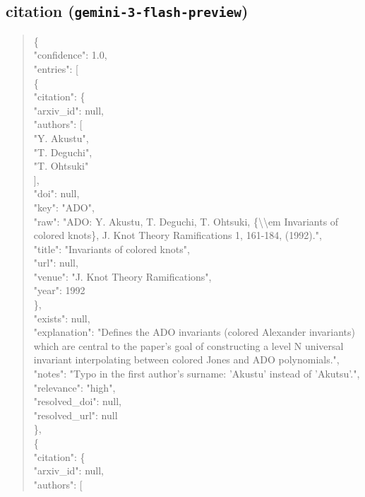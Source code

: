 \documentclass[11pt]{article}
\begin{document}
\subsection*{citation (\texttt{gemini-3-flash-preview})}
\begin{quote}\small\ttfamily\raggedright
\{\\
  "confidence": 1.0,\\
  "entries": [\\
    \{\\
      "citation": \{\\
        "arxiv\_id": null,\\
        "authors": [\\
          "Y. Akustu",\\
          "T. Deguchi",\\
          "T. Ohtsuki"\\
        ],\\
        "doi": null,\\
        "key": "ADO",\\
        "raw": "ADO: Y. Akustu, T. Deguchi, T. Ohtsuki, \{\textbackslash{}\textbackslash{}em Invariants of colored knots\}, J. Knot Theory Ramifications 1, 161-184, (1992).",\\
        "title": "Invariants of colored knots",\\
        "url": null,\\
        "venue": "J. Knot Theory Ramifications",\\
        "year": 1992\\
      \},\\
      "exists": null,\\
      "explanation": "Defines the ADO invariants (colored Alexander invariants) which are central to the paper's goal of constructing a level N universal invariant interpolating between colored Jones and ADO polynomials.",\\
      "notes": "Typo in the first author's surname: 'Akustu' instead of 'Akutsu'.",\\
      "relevance": "high",\\
      "resolved\_doi": null,\\
      "resolved\_url": null\\
    \},\\
    \{\\
      "citation": \{\\
        "arxiv\_id": null,\\
        "authors": [\\

\end{quote}
\end{document}
